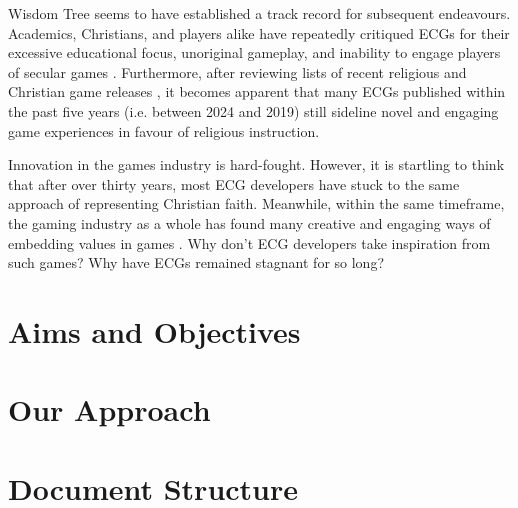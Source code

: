 
Wisdom Tree seems to have established a track record for subsequent endeavours. Academics, Christians, and players alike have repeatedly critiqued \acp{ECG} for their excessive educational focus, unoriginal gameplay, and inability to engage players of secular games \parencite{bogost_persuasive_2007, schut_making_2013, moon_channel_why_2023, innocentbystander_why_2009}. Furthermore, after reviewing lists of recent religious and Christian game releases \parencite{gonzalez_religious_2022, noauthor_list_2024}, it becomes apparent that many \acp{ECG} published within the past five years (i.e. between 2024 and 2019) still sideline novel and engaging game experiences in favour of religious instruction.%









Innovation in the games industry is hard-fought. However, it is startling to think that after over thirty years, most \ac{ECG} developers have stuck to the same approach of representing Christian faith. Meanwhile, within the same timeframe, the gaming industry as a whole has found many creative and engaging ways of embedding values in games \parencite{bogost_persuasive_2007, flanagan_values_2014}. Why don't \ac{ECG} developers take inspiration from such games? Why have \acp{ECG} remained stagnant for so long?

\section{Aims and Objectives} 
\blindtext

\section{Our Approach} 
\blindtext

\section{Document Structure}
\blindtext
